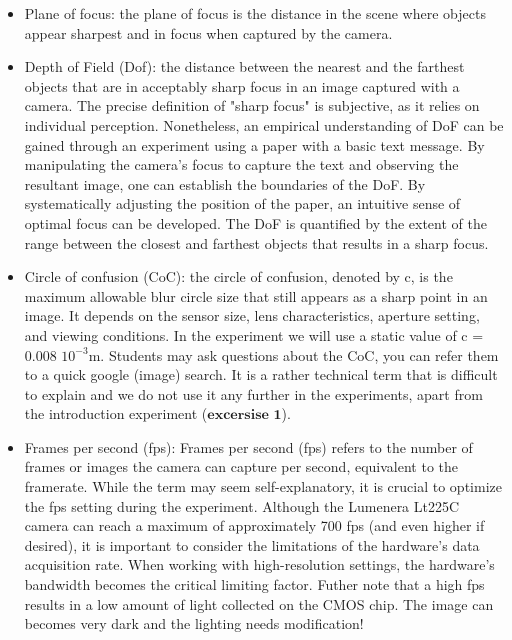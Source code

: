 \documentclass{article}
\begin{document}
\begin{itemize}
    \item Plane of focus: the plane of focus is the distance in the scene where objects appear sharpest and in focus when captured by the camera.
    
    \item Depth of Field (Dof): the distance between the nearest and the farthest objects that are in acceptably sharp focus in an image captured with a camera. The precise definition of "sharp focus" is subjective, as it relies on individual perception. Nonetheless, an empirical understanding of DoF can be gained through an experiment using a paper with a basic text message. By manipulating the camera's focus to capture the text and observing the resultant image, one can establish the boundaries of the DoF. By systematically adjusting the position of the paper, an intuitive sense of optimal focus can be developed. The DoF is quantified by the extent of the range between the closest and farthest objects that results in a sharp focus. 
    
    \item Circle of confusion (CoC): the circle of confusion, denoted by c, is the maximum allowable blur circle size that still appears as a sharp point in an image. It depends on the sensor size, lens characteristics, aperture setting, and viewing conditions. In the experiment we will use a static value of c = 0.008 $10^{-3}$m. Students may ask questions about the CoC, you can refer them to a quick google (image) search. It is a rather technical term that is difficult to explain and we do not use it any further in the experiments, apart from the introduction experiment ($\textbf{excersise 1}$).
    
    \item Frames per second (fps): Frames per second (fps) refers to the number of frames or images the camera can capture per second, equivalent to the framerate. While the term may seem self-explanatory, it is crucial to optimize the fps setting during the experiment. Although the Lumenera Lt225C camera can reach a maximum of approximately 700 fps (and even higher if desired), it is important to consider the limitations of the hardware's data acquisition rate. When working with high-resolution settings, the hardware's bandwidth becomes the critical limiting factor. Futher note that a high fps results in a low amount of light collected on the CMOS chip. The image can becomes very dark and the lighting needs modification!


\end{itemize}
\end{document}
